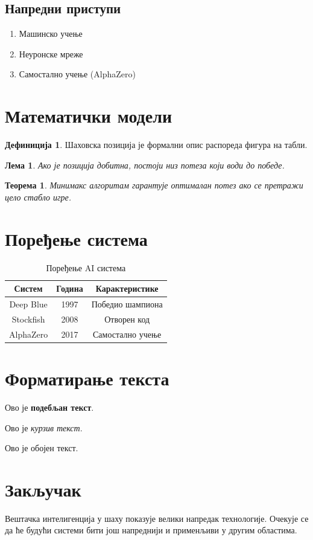\documentclass[12pt]{article}
\newtheorem{teorema}{Теорема}
\newtheorem{lema}{Лема}
\theoremstyle{definition}
\newtheorem{definicija}{Дефиниција}
\begin{document}
\subsection{Напредни приступи}

\begin{enumerate}
    \item Машинско учење
    \item Неуронске мреже
    \item Самостално учење (AlphaZero)
\end{enumerate}

\section{Математички модели}

\begin{definicija}
Шаховска позиција је формални опис распореда фигура на табли.
\end{definicija}

\begin{lema}
Ако је позиција добитна, постоји низ потеза који води до победе.
\end{lema}

\begin{teorema}
Минимакс алгоритам гарантује оптималан потез ако се претражи цело стабло игре.
\end{teorema}

\section{Поређење система}

\begin{table}[h!]
\centering
\begin{tabular}{|c|c|c|}
\hline
Систем & Година & Карактеристике \\
\hline
Deep Blue & 1997 & Победио шампиона \\
Stockfish & 2008 & Отворен код \\
AlphaZero & 2017 & Самостално учење \\
\hline
\end{tabular}
\caption{Поређење AI система}
\end{table}

\section{Форматирање текста}

Ово је \textbf{подебљан текст}.

Ово је \textit{курзив текст}.

Ово је {\color{blue}обојен текст}.

\section{Закључак}

Вештачка интелигенција у шаху показује велики напредак технологије.
Очекује се да ће будући системи бити још напреднији и применљиви у другим областима.
\end{document}
